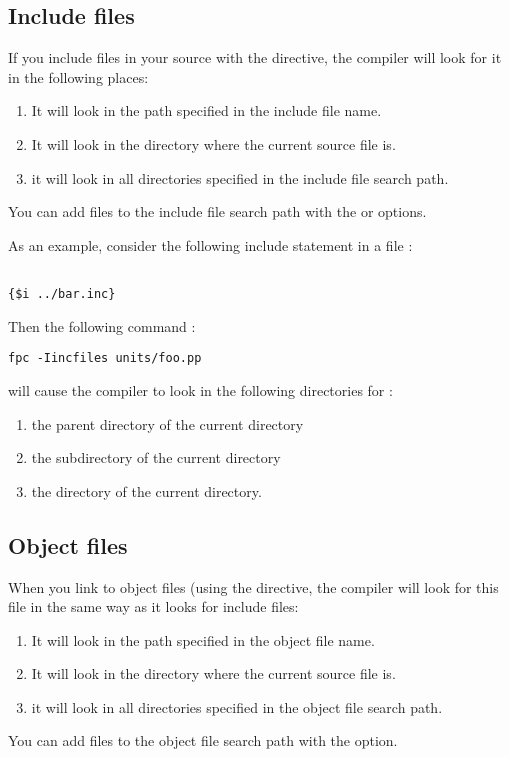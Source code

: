 \subsection{Include files}
If you include files in your source with the 
directive, the compiler will look for it in the following places:

\begin{enumerate}
\item It will look in the path specified in the include file name.
\item It will look in the directory where the current source file is.
\item it will look in all directories specified in the include file search
path.
\end{enumerate}
You can add files to the include file search path with the  or
 options.

As an example, consider the following include statement in a file
:
\begin{verbatim}

{$i ../bar.inc}

\end{verbatim}
Then the following command :
\begin{verbatim}
fpc -Iincfiles units/foo.pp
\end{verbatim}
will cause the compiler to look in the following directories for
:
\begin{enumerate}
\item the parent directory of the current directory
\item the  subdirectory of the current directory
\item the  directory of the current directory.
\end{enumerate}

\subsection{Object files}
When you link to object files (using the  directive,
the compiler will look for this file in the same way as it looks for include
files:

\begin{enumerate}
\item It will look in the path specified in the object file name.
\item It will look in the directory where the current source file is.
\item it will look in all directories specified in the object file search path.
\end{enumerate}
You can add files to the object file search path with the  option.

